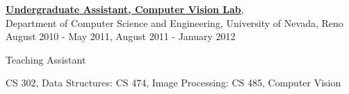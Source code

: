 \documentclass[10pt]{article}
\newenvironment{outerlist}[1][\enskip\textbullet]%
        {\begin{itemize}[#1]}{\end{itemize}%
         \vspace{-.6\baselineskip}}
\newenvironment{innerlist}[1][\enskip\textbullet]%
        {\begin{compactitem}[#1]}{\end{compactitem}}
\begin{document}
\href{http://www.cse.unr.edu/CVL/}
     {\textbf{Undergraduate Assistant, Computer Vision Lab}},\\
     Department of Computer Science and Engineering, University of Nevada, Reno\\
     August 2010 - May 2011, August 2011 - January 2012
     \begin{outerlist}
     \item Teaching Assistant
        \begin{innerlist}
        \item CS 302, Data Structures: CS 474, Image Processing: CS 485, Computer Vision\\
        \end{innerlist}
     \end{outerlist}


\end{document}
